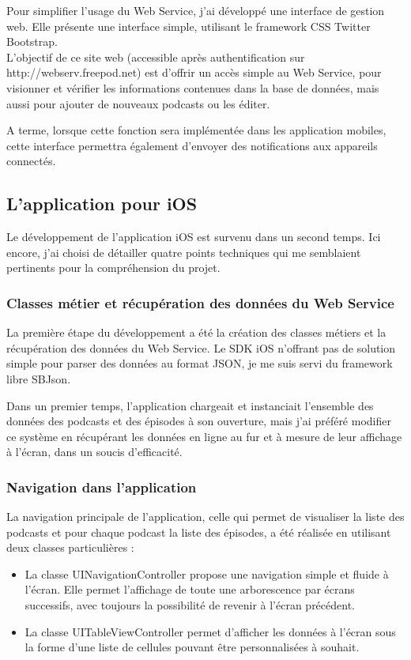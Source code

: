 \documentclass[11pt, french]{report}
\begin{document}
Pour simplifier l'usage du Web Service, j'ai développé une interface de gestion web. Elle présente une interface simple, utilisant le framework CSS Twitter Bootstrap.\\

L'objectif de ce site web (accessible après authentification sur http://webserv.freepod.net) est d'offrir un accès simple au Web Service, pour visionner et vérifier les informations contenues dans la base de données, mais aussi pour ajouter de nouveaux podcasts ou les éditer.

A terme, lorsque cette fonction sera implémentée dans les application mobiles, cette interface permettra également d'envoyer des notifications aux appareils connectés.

\subsection{L'application pour iOS}

Le développement de l'application iOS est survenu dans un second temps. Ici encore, j'ai choisi de détailler quatre points techniques qui me semblaient pertinents pour la compréhension du projet.

\subsubsection{Classes métier et récupération des données du Web Service}

La première étape du développement a été la création des classes métiers et la récupération des données du Web Service. Le SDK iOS n'offrant pas de solution simple pour parser des données au format JSON, je me suis servi du framework libre SBJson.

Dans un premier temps, l'application chargeait et instanciait l'ensemble des données des podcasts et des épisodes à son ouverture, mais j'ai préféré modifier ce système en récupérant les données en ligne au fur et à mesure de leur affichage à l'écran, dans un soucis d'efficacité.

\subsubsection{Navigation dans l'application}

La navigation principale de l'application, celle qui permet de visualiser la liste des podcasts et pour chaque podcast la liste des épisodes, a été réalisée en utilisant deux classes particulières :
\begin{itemize}
	\item La classe UINavigationController propose une navigation simple et fluide à l'écran. Elle permet l'affichage de toute une arborescence par écrans successifs, avec toujours la possibilité de revenir à l'écran précédent.
	\item La classe UITableViewController permet d'afficher les données à l'écran sous la forme d'une liste de cellules pouvant être personnalisées à souhait.\\
\end{itemize}
\end{document}

